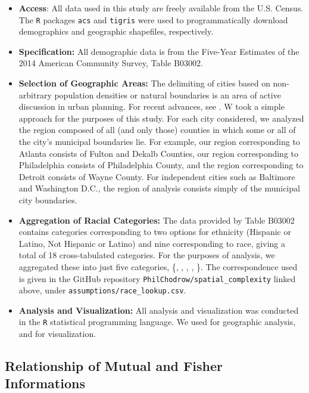 \documentclass[english]{scrartcl}
\begin{document}
	\begin{itemize}
		\item \textbf{Access}: All data used in this study are freely available from the U.S. Census. The \texttt{R} packages \texttt{acs} and \texttt{tigris} were used to programmatically download demographics and geographic shapefiles, respectively.
		\item \textbf{Specification:} All demographic data is from the Five-Year Estimates of the 2014 American Community Survey, Table B03002. 
		\item \textbf{Selection of Geographic Areas:} The delimiting of cities based on non-arbitrary population densities or natural boundaries is an area of active discussion in urban planning. For recent advances, see \cite{Rozenfeld2008,Rozenfeld2011}. W took a simple approach for the purposes of this study. For each city considered, we analyzed the region composed of all (and only those) counties in which some or all of the city's municipal boundaries lie. For example, our region corresponding to Atlanta consists of Fulton and Dekalb Counties, our region corresponding to Philadelphia consists of Philadelphia County, and the region corresponding to Detroit consists of Wayne County. For independent cities such as Baltimore and Washington D.C., the region of analysis consists simply of the municipal city boundaries. 
		\item \textbf{Aggregation of Racial Categories:} The data provided by Table B03002 contains categories corresponding to two options for ethnicity (Hispanic or Latino, Not Hispanic or Latino) and nine corresponding to race, giving a total of 18 cross-tabulated categories. For the purposes of analysis, we aggregated these into just five categories, \{, , , , \}. The correspondence used is given in the GitHub repository \texttt{PhilChodrow/spatial\_complexity} linked above, under \texttt{assumptions/race\_lookup.csv}. 
		\item \textbf{Analysis and Visualization:} All analysis and visualization was conducted in the \texttt{R} statistical programming language. We used \cite{Bivand2014b,Bivand2014a,Bivand2014} for geographic analysis, and \cite{Wickham} for visualization.
	\end{itemize}

		

	\subsection*{Relationship of Mutual and Fisher Informations}
\end{document}
